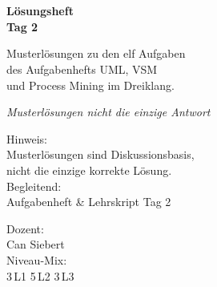 \documentclass[11pt,a4paper,oneside]{article}
\newcommand{\caveatfontfallback}{\itshape}
\newcommand\caveatfont{\caveatfontfallback}%
\begin{document}
\begin{titlepage}
  \pagestyle{empty}
  \vspace*{1.5cm}
  \\[2pt]
  \noindent{\color{lpAccent}\rule{\linewidth}{1.2pt}}\\[4pt]

  \vspace{3cm}
  {\sffamily\fontsize{30}{34}\selectfont\bfseries\color{lpInk}L\"osungsheft\\Tag 2\par}

  \vspace{0.7cm}
  {\sffamily\large\color{lpGray}Musterl\"osungen zu den elf Aufgaben\\des Aufgabenhefts \textendash{} UML, VSM\\und Process Mining im Dreiklang.\par}

  \vspace{1.5cm}
  {\caveatfont\LARGE\color{lpGreen}Musterl\"osungen \textperiodcentered{} nicht die einzige Antwort}\par

  \vfill

  \noindent\begin{minipage}{0.55\linewidth}
    {\sffamily\footnotesize\color{lpGray}Hinweis:}\\
    {\sffamily\small\color{lpInk}Musterl\"osungen sind Diskussionsbasis,\\nicht die einzige korrekte L\"osung.}\\[10pt]
    {\sffamily\footnotesize\color{lpGray}Begleitend:}\\
    {\sffamily\small\color{lpInk}Aufgabenheft \& Lehrskript Tag 2}
  \end{minipage}\hfill
  \begin{minipage}{0.4\linewidth}
    \raggedleft
    {\sffamily\footnotesize\color{lpGray}Dozent:}\\
    {\sffamily\small\color{lpInk}Can Siebert}\\[10pt]
    {\sffamily\footnotesize\color{lpGray}Niveau-Mix:}\\
    {\sffamily\small\color{lpInk}3\,L1 \textperiodcentered{} 5\,L2 \textperiodcentered{} 3\,L3}
  \end{minipage}

  \vspace{0.5cm}
  \noindent{\color{lpAccent}\rule{\linewidth}{0.6pt}}
\end{titlepage}
\end{document}
